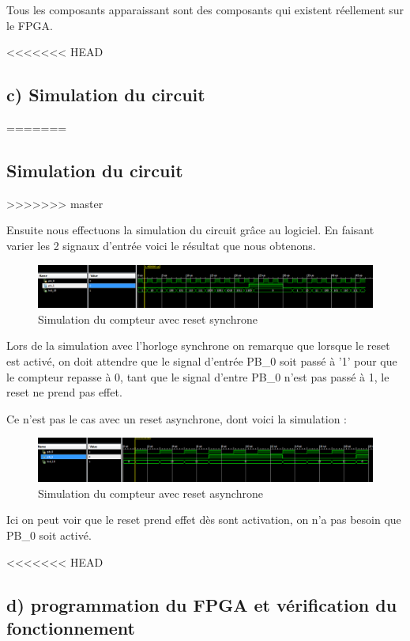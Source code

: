 \documentclass[11pt]{report}
\begin{document}
Tous les composants apparaissant sont des composants qui existent réellement sur le FPGA. 

\newpage
<<<<<<< HEAD

\subsection{ c) Simulation du circuit}
=======
 
\subsection{ Simulation du circuit}
>>>>>>> master

Ensuite nous effectuons la simulation du circuit grâce au logiciel.
En faisant varier les 2 signaux d'entrée voici le résultat que nous obtenons.

\begin{figure}[h]
\includegraphics[width=15cm]{TP02-1.PNG}
\caption{Simulation du compteur avec reset synchrone}
\end{figure}

Lors de la simulation avec l'horloge synchrone on remarque que lorsque le reset est activé, on doit attendre que le signal d'entrée PB\_0 soit passé à '1' pour que le compteur repasse à 0, tant que le signal d'entre PB\_0 n'est pas passé à 1, le reset ne prend pas effet.

Ce n'est pas le cas avec un reset asynchrone, dont voici la simulation :

\begin{figure}[h]
\includegraphics[width=15cm]{TP02-5.PNG}
\caption{Simulation du compteur avec reset asynchrone}
\end{figure}

Ici on peut voir que le reset prend effet dès sont activation, on n'a pas besoin que PB\_0 soit activé.


<<<<<<< HEAD
   \subsection{ d) programmation du FPGA et vérification du fonctionnement}
\end{document}
